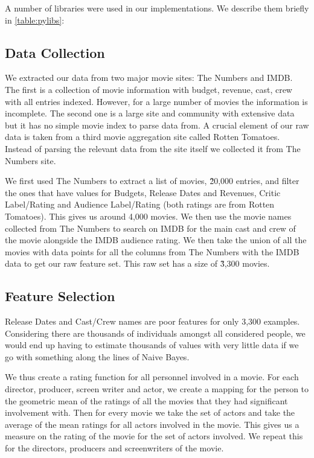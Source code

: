 \documentclass[conference]{IEEEtran}
\begin{document}
A number of libraries were used in our implementations. We describe them briefly in \ref{table:pylibs}: 

\subsection{Data Collection}
We extracted our data from two major movie sites: The Numbers \cite{thenumbers} and IMDB\cite{imdb}.
The first is a collection of movie information with budget, revenue, cast, crew with all entries indexed. However, for a large number of movies the information is incomplete. The second one is a large site and community with extensive data but it has no simple movie index to parse data from. A crucial element of our raw data is taken from a third movie aggregation site called Rotten Tomatoes. Instead of parsing the relevant data from the site itself we collected it from The Numbers site.

We first used The Numbers to extract a list of movies, \~20,000 entries, and 
filter the ones that have values for Budgets, Release Dates and 
Revenues, Critic Label/Rating and Audience Label/Rating
(both ratings are from Rotten Tomatoes\cite{rtomato}). 
This gives us around 4,000 movies. We then use the movie names 
collected from The Numbers to search on IMDB for the main cast 
and crew of the movie alongside the IMDB audience rating. We then 
take the union of all the movies with data points for all the 
columns from The Numbers with the IMDB data to get our raw
feature set. This raw set has a size of \~3,300 movies.

\subsection{Feature Selection}
Release Dates and Cast/Crew names are poor features for only 
3,300 examples. Considering there are thousands of individuals amongst
all considered people, we would end up having to estimate 
thousands of values with very little data if we go with something 
along the lines of Naive Bayes. 

We thus create a rating function for all personnel involved in a movie. 
For each director, producer, screen writer and actor, we create a mapping
for the person to the geometric mean of the ratings of all the movies that they 
had significant involvement with. Then for every movie we take the set of actors
and take the average of the mean ratings for all actors involved in the movie. This
gives us a measure on the rating of the movie for the set of actors involved. We 
repeat this for the directors, producers and screenwriters of the movie. 
\end{document}
